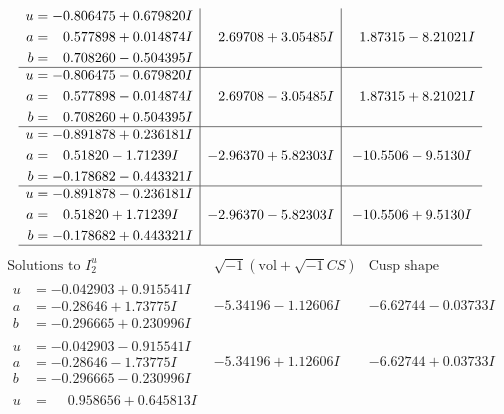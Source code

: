 \documentclass[1p]{elsarticle_modified}
\theoremstyle{definition}
\newcommand{\I}{\sqrt{-1}}
\begin{document}
$$\begin{array}{c|c|c}
\begin{aligned}
u &= -0.806475 + 0.679820 I \\
a &= \phantom{-}0.577898 + 0.014874 I \\
b &= \phantom{-}0.708260 - 0.504395 I\end{aligned}
 & \phantom{-}2.69708 + 3.05485 I & \phantom{-}1.87315 - 8.21021 I \\ \hline\begin{aligned}
u &= -0.806475 - 0.679820 I \\
a &= \phantom{-}0.577898 - 0.014874 I \\
b &= \phantom{-}0.708260 + 0.504395 I\end{aligned}
 & \phantom{-}2.69708 - 3.05485 I & \phantom{-}1.87315 + 8.21021 I \\ \hline\begin{aligned}
u &= -0.891878 + 0.236181 I \\
a &= \phantom{-}0.51820 - 1.71239 I \\
b &= -0.178682 - 0.443321 I\end{aligned}
 & -2.96370 + 5.82303 I & -10.5506 - 9.5130 I \\ \hline\begin{aligned}
u &= -0.891878 - 0.236181 I \\
a &= \phantom{-}0.51820 + 1.71239 I \\
b &= -0.178682 + 0.443321 I\end{aligned}
 & -2.96370 - 5.82303 I & -10.5506 + 9.5130 I\\
 \hline 
 \end{array}$$\newpage$$\begin{array}{c|c|c}  
\text{Solutions to }I^u_{2}& \I (\text{vol} + \sqrt{-1}CS) & \text{Cusp shape}\\
 \hline 
\begin{aligned}
u &= -0.042903 + 0.915541 I \\
a &= -0.28646 + 1.73775 I \\
b &= -0.296665 + 0.230996 I\end{aligned}
 & -5.34196 - 1.12606 I & -6.62744 - 0.03733 I \\ \hline\begin{aligned}
u &= -0.042903 - 0.915541 I \\
a &= -0.28646 - 1.73775 I \\
b &= -0.296665 - 0.230996 I\end{aligned}
 & -5.34196 + 1.12606 I & -6.62744 + 0.03733 I \\ \hline\begin{aligned}
u &= \phantom{-}0.958656 + 0.645813 I \\

\end{aligned}
\end{array}$$
\end{document}
